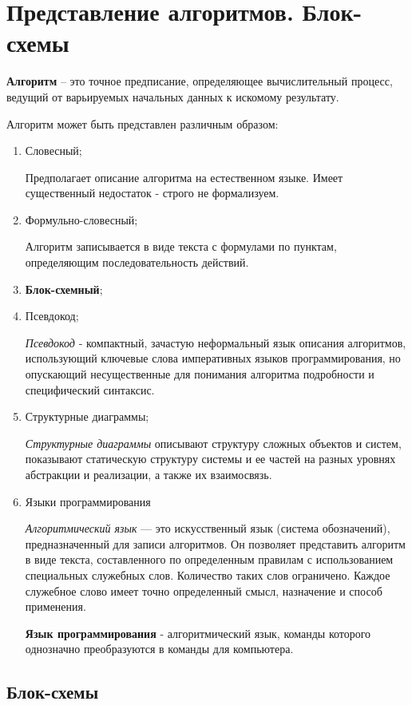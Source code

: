 \section{Представление алгоритмов. Блок-схемы}

\textbf{Алгоритм} -- это точное предписание, определяющее вычислительный
процесс, ведущий от варьируемых начальных данных к искомому результату.

Алгоритм может быть представлен различным образом:
\begin{enumerate}
\item
  Словесный;

  Предполагает описание алгоритма на естественном языке. Имеет существенный недостаток - строго не формализуем.

\item
  Формульно-словесный;

  Алгоритм записывается в виде текста с формулами по пунктам,
  определяющим последовательность действий.
\item
  \textbf{Блок-схемный};
\item
  Псевдокод;

  \emph{Псевдокод} - компактный, зачастую неформальный язык описания
  алгоритмов, использующий ключевые слова императивных языков
  программирования, но опускающий несущественные для понимания алгоритма
  подробности и специфический синтаксис.
\item
  Структурные диаграммы;

  \emph{Структурные диаграммы} описывают структуру сложных объектов и
  систем, показывают статическую структуру системы и ее частей на разных
  уровнях абстракции и реализации, а также их взаимосвязь.
\item
  Языки программирования

  \emph{Алгоритмический язык} --- это искусственный язык (система
  обозначений), предназначенный для записи алгоритмов. Он позволяет
  представить алгоритм в виде текста, составленного по определенным
  правилам с использованием специальных служебных слов. Количество таких
  слов ограничено. Каждое служебное слово имеет точно определенный
  смысл, назначение и способ применения.

  \textbf{Язык программирования} - алгоритмический язык, команды
  которого однозначно преобразуются в команды для компьютера.
\end{enumerate}

\subsection{Блок-схемы}\label{ux431ux43bux43eux43a-ux441ux445ux435ux43cux44b}

